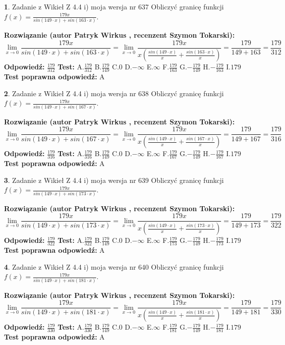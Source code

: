 \documentclass[12pt, a4paper]{article}
\theoremstyle{definition} %
\newtheorem{zad}{}
\newcommand{\zadStart}[1]{\begin{zad}#1\newline}
\newcommand{\zadStop}{\end{zad}}
\newcommand{\rozwStart}[2]{\noindent \textbf{Rozwiązanie (autor #1 , recenzent #2): }\newline}
\newcommand{\rozwStop}{\newline}
\newcommand{\odpStart}{\noindent \textbf{Odpowiedź:}\newline}
\newcommand{\odpStop}{\newline}
\newcommand{\testStart}{\noindent \textbf{Test:}\newline}
\newcommand{\testStop}{\newline}
\newcommand{\kluczStart}{\noindent \textbf{Test poprawna odpowiedź:}\newline}
\newcommand{\kluczStop}{\newline}
\begin{document}
\zadStart{Zadanie z Wikieł Z 4.4 i) moja wersja nr 637}
Obliczyć granicę funkcji $f(x)=\frac{179x}{sin(149\cdot x) +sin(163\cdot x)}$.
\zadStop
\rozwStart{Patryk Wirkus}{Szymon Tokarski}
$$\lim\limits_{x\to 0}\frac{179x}{sin(149\cdot x) +sin(163\cdot x)}=\lim\limits_{x\to 0}\frac{179x}{x(\frac{sin(149\cdot x)}{x}+\frac{sin(163\cdot x)}{x})}=\frac{179}{149+163} = \frac{179}{312}$$
\rozwStop
\odpStart
$\frac{179}{312}$
\odpStop
\testStart
A.$\frac{179}{312}$
B.$\frac{179}{149}$
C.$0$
D.$-\infty$
E.$\infty$
F.$\frac{179}{163}$
G.$-\frac{179}{149}$
H.$-\frac{179}{163}$
I.$179$
\testStop
\kluczStart
A
\kluczStop



\zadStart{Zadanie z Wikieł Z 4.4 i) moja wersja nr 638}
Obliczyć granicę funkcji $f(x)=\frac{179x}{sin(149\cdot x) +sin(167\cdot x)}$.
\zadStop
\rozwStart{Patryk Wirkus}{Szymon Tokarski}
$$\lim\limits_{x\to 0}\frac{179x}{sin(149\cdot x) +sin(167\cdot x)}=\lim\limits_{x\to 0}\frac{179x}{x(\frac{sin(149\cdot x)}{x}+\frac{sin(167\cdot x)}{x})}=\frac{179}{149+167} = \frac{179}{316}$$
\rozwStop
\odpStart
$\frac{179}{316}$
\odpStop
\testStart
A.$\frac{179}{316}$
B.$\frac{179}{149}$
C.$0$
D.$-\infty$
E.$\infty$
F.$\frac{179}{167}$
G.$-\frac{179}{149}$
H.$-\frac{179}{167}$
I.$179$
\testStop
\kluczStart
A
\kluczStop



\zadStart{Zadanie z Wikieł Z 4.4 i) moja wersja nr 639}
Obliczyć granicę funkcji $f(x)=\frac{179x}{sin(149\cdot x) +sin(173\cdot x)}$.
\zadStop
\rozwStart{Patryk Wirkus}{Szymon Tokarski}
$$\lim\limits_{x\to 0}\frac{179x}{sin(149\cdot x) +sin(173\cdot x)}=\lim\limits_{x\to 0}\frac{179x}{x(\frac{sin(149\cdot x)}{x}+\frac{sin(173\cdot x)}{x})}=\frac{179}{149+173} = \frac{179}{322}$$
\rozwStop
\odpStart
$\frac{179}{322}$
\odpStop
\testStart
A.$\frac{179}{322}$
B.$\frac{179}{149}$
C.$0$
D.$-\infty$
E.$\infty$
F.$\frac{179}{173}$
G.$-\frac{179}{149}$
H.$-\frac{179}{173}$
I.$179$
\testStop
\kluczStart
A
\kluczStop



\zadStart{Zadanie z Wikieł Z 4.4 i) moja wersja nr 640}
Obliczyć granicę funkcji $f(x)=\frac{179x}{sin(149\cdot x) +sin(181\cdot x)}$.
\zadStop
\rozwStart{Patryk Wirkus}{Szymon Tokarski}
$$\lim\limits_{x\to 0}\frac{179x}{sin(149\cdot x) +sin(181\cdot x)}=\lim\limits_{x\to 0}\frac{179x}{x(\frac{sin(149\cdot x)}{x}+\frac{sin(181\cdot x)}{x})}=\frac{179}{149+181} = \frac{179}{330}$$
\rozwStop
\odpStart
$\frac{179}{330}$
\odpStop
\testStart
A.$\frac{179}{330}$
B.$\frac{179}{149}$
C.$0$
D.$-\infty$
E.$\infty$
F.$\frac{179}{181}$
G.$-\frac{179}{149}$
H.$-\frac{179}{181}$
I.$179$
\testStop
\kluczStart
A
\kluczStop
\end{document}
